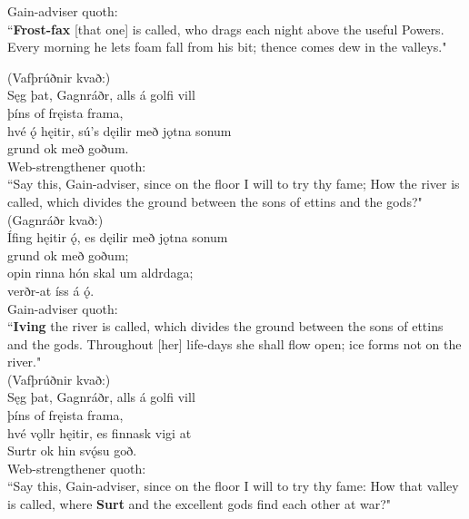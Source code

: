 \bvb Gain-adviser quoth: \\ “\textbf{Frost-fax} [that one] is called, who drags each night above the useful Powers. Every morning he lets foam fall from his bit\footnotemark[26]; thence comes dew in the valleys." \\

(Vafþrúðnir kvað:) \\%
\bva Sęg þat, Gagnráðr, \hld alls á golfi vill \\%
þíns of fręista frama, \\%
hvé ǫ́ hęitir, \hld sú's dęilir með jǫtna sonum \\%
grund ok með goðum.\\%

\bvb Web-strengthener quoth: \\ “Say this, Gain-adviser, since on the floor I will to try thy fame; How the river is called, which divides the ground between the sons of ettins and the gods?" \\

(Gagnráðr kvað:) \\%
\bva Ífing hęitir ǫ́, \hld es dęilir með jǫtna sonum \\%
grund ok með goðum; \\%
opin rinna \hld hón skal um aldrdaga; \\%
verðr-at íss á ǫ́.\\%

\bvb Gain-adviser quoth: \\ “\textbf{Iving} the river is called, which divides the ground between the sons of ettins and the gods. Throughout [her] life-days she shall flow open; ice forms not on the river." \\

(Vafþrúðnir kvað:) \\%
\bva Sęg þat, Gagnráðr, \hld alls á golfi vill \\%
þíns of fręista frama, \\%
hvé vǫllr hęitir, \hld es finnask vigi at \\%
Surtr ok hin svǫ́su goð.\\%

\bvb Web-strengthener quoth: \\ “Say this, Gain-adviser, since on the floor I will to try thy fame: How that valley is called, where \textbf{Surt} and the excellent gods find each other at war?" \\

